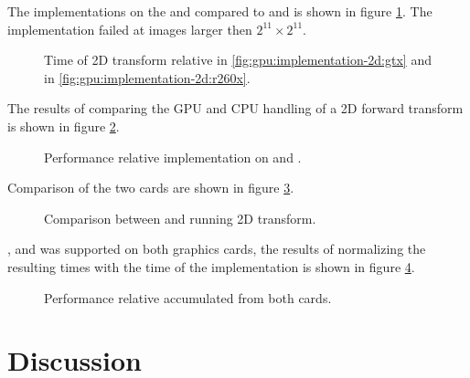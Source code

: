 The implementations on the {\NVCARD} and {\AMDCARD} compared to {\CU} and {\OCL} is shown in figure \ref{fig:gpu:implementation-2d}. The {\GL} implementation failed at images larger then $2^{11}{\times}2^{11}$.

\begin{figure}
	\centering
	\subfloat[\NVCARD\label{fig:gpu:implementation-2d:gtx}]{	
		
	}
	\vfill
	\subfloat[\AMDCARD\label{fig:gpu:implementation-2d:r260x}]{
		
	}	
	\caption{Time of \gls{2D} transform relative {\CU} in \ref{fig:gpu:implementation-2d:gtx} and {\OCL} in \ref{fig:gpu:implementation-2d:r260x}.}
	\label{fig:gpu:implementation-2d}
\end{figure}

The results of comparing the \gls{GPU} and \gls{CPU} handling of a \gls{2D} forward transform is shown in figure \ref{fig:gtx:cpu-2d}.

\begin{figure}
	\centering
	
	\caption{Performance relative {\CU} implementation on {\NVCARD} and {\INTELCPU}.}
	\label{fig:gtx:cpu-2d}
\end{figure}

Comparison of the two cards are shown in figure \ref{fig:gpu-comparison-2d}.

\begin{figure}
	\centering
	
	\caption{Comparison between {\AMDCARD} and {\NVCARD} running \gls{2D} transform.}
	\label{fig:gpu-comparison-2d}
\end{figure}

{\DX}, {\GL} and {\OCL} was supported on both graphics cards, the results of normalizing the resulting times with the time of the {\OCL} implementation is shown in figure \ref{fig:gpu-comparison-tech-2d}.

\begin{figure}
	\centering
	
	\caption{Performance relative {\OCL} accumulated from both cards.}
	\label{fig:gpu-comparison-tech-2d}
\end{figure}

\newpage

\section{Discussion}

